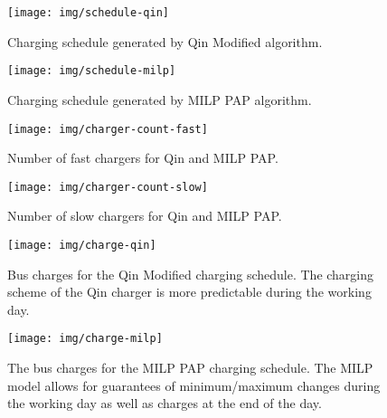 \documentclass[utf8]{FrontiersinHarvard}
\begin{document}
\begin{subfigures}
    \begin{figure}[htpb]
    \centering
    \texttt{[image: img/schedule-qin]}
        \caption{Charging schedule generated by Qin Modified algorithm.}
        \label{subfig:qin-schedule}
    \end{figure}

    \hfill

    \begin{figure}[htpb]
    \centering
        \texttt{[image: img/schedule-milp]}
        \caption{Charging schedule generated by MILP PAP algorithm.}
        \label{subfig:milp-schedule}
    \end{figure}
\end{subfigures}

\begin{subfigures}
    \begin{figure}[htpb]
    \centering
        \texttt{[image: img/charger-count-fast]}
        \caption{Number of fast chargers for Qin and MILP PAP.}
        \label{subfig:fast-charger-usage}
    \end{figure}

    \hfill

    \begin{figure}[!ht]
    \centering
        \texttt{[image: img/charger-count-slow]}
        \caption{Number of slow chargers for Qin and MILP PAP.}
        \label{subfig:slow-charger-usage}
    \end{figure}
\end{subfigures}

\begin{subfigures}
    \begin{figure}[htpb]
    \centering
        \texttt{[image: img/charge-qin]}
        \caption{Bus charges for the Qin Modified charging schedule. The charging scheme of the Qin charger is more predictable during the working day.}
        \label{subfig:qin-charge}
    \end{figure}

    \hfill

    \begin{figure}[htpb]
    \centering
        \texttt{[image: img/charge-milp]}
        \caption{The bus charges for the MILP PAP charging schedule. The MILP model allows for guarantees of minimum/maximum changes during the working day as well as charges at the end of the day.}
        \label{subfig:milp-charge}
    \end{figure}
\end{subfigures}
\end{document}
